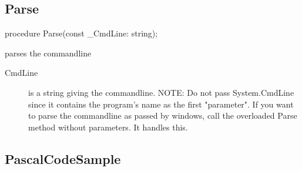 \documentclass{report}
\newif\ifpdf
\begin{document}
\subsection*{Parse}
\fi
\label{ok_helpinsight_comments-Parse}
\begin{list}{}{
\setlength{\itemindent}{0cm}
\setlength{\listparindent}{0cm}
\setlength{\leftmargin}{\evensidemargin}
\addtolength{\leftmargin}{\tmplength}
\settowidth{\labelsep}{X}
\addtolength{\leftmargin}{\labelsep}
\setlength{\labelwidth}{\tmplength}
}
\item[\textbf{Declaration}\hfill]
\ifpdf
\begin{flushleft}
\fi
\begin{ttfamily}
procedure Parse(const {\_}CmdLine: string);\end{ttfamily}

\ifpdf
\end{flushleft}
\fi

\par
\item[\textbf{Description}]
parses the commandline\hfill\vspace*{1ex}

 \par
\item[\textbf{Parameters}]
\begin{description}
\item[CmdLine] is a string giving the commandline. NOTE: Do not pass System.CmdLine since it contains the program's name as the first "parameter". If you want to parse the commandline as passed by windows, call the overloaded Parse method without parameters. It handles this.
\end{description}


\end{list}
\ifpdf
\subsection*{\large{\textbf{PascalCodeSample}}\normalsize\hspace{1ex}\hrulefill}
\else
\end{document}
